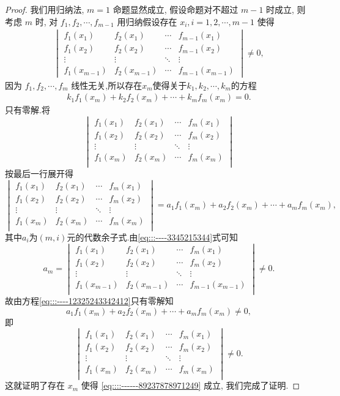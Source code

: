\documentclass[../../main.tex]{subfiles}%
\begin{document}
\begin{proof}
我们用归纳法, \( m = 1 \) 命题显然成立, 假设命题对不超过 \( m - 1 \) 时成立, 则考虑 \( m \) 时, 对 \( f_1, f_2, \cdots, f_{m - 1} \) 用归纳假设存在 \( x_i, i = 1, 2, \cdots, m - 1 \) 使得
\begin{align}\label{eq:::----3345215344}
\begin{vmatrix}
f_1(x_1) & f_2(x_1) & \cdots & f_{m - 1}(x_1) \\
f_1(x_2) & f_2(x_2) & \cdots & f_{m - 1}(x_2) \\
\vdots & \vdots & \ddots & \vdots \\
f_1(x_{m - 1}) & f_2(x_{m - 1}) & \cdots & f_{m - 1}(x_{m - 1})
\end{vmatrix} \neq 0,
\end{align}
因为 \( f_1, f_2, \cdots, f_m \) 线性无关,所以存在$x_m$使得关于$k_1,k_2,\cdots,k_m$的方程
\begin{align}\label{eq:::----12325243342412}
k_1f_1\left( x_m \right) +k_2f_2\left( x_m \right) +\cdots +k_mf_m\left( x_m \right) =0.
\end{align}
只有零解.将
\[
\begin{vmatrix}
f_1(x_1)&f_2(x_1)&\cdots&f_m(x_1)\\
f_1(x_2)&f_2(x_2)&\cdots&f_m(x_2)\\
\vdots&\vdots&\ddots&\vdots\\
f_1(x_m)&f_2(x_m)&\cdots&f_m(x_m)\\
\end{vmatrix}
\]
按最后一行展开得
\[
\begin{vmatrix}
f_1(x_1)&f_2(x_1)&\cdots&f_m(x_1)\\
f_1(x_2)&f_2(x_2)&\cdots&f_m(x_2)\\
\vdots&\vdots&\ddots&\vdots\\
f_1(x_m)&f_2(x_m)&\cdots&f_m(x_m)\\
\end{vmatrix}=a_1f_1(x_m)+a_2f_2(x_m)+\cdots+a_mf_m(x_m),
\]
其中$a_i$为$(m,i)$元的代数余子式.由\eqref{eq:::----3345215344}式可知
\[
a_m=\begin{vmatrix}
f_1(x_1)&f_2(x_1)&\cdots&f_m(x_1)\\
f_1(x_2)&f_2(x_2)&\cdots&f_m(x_2)\\
\vdots&\vdots&\ddots&\vdots\\
f_1(x_{m-1})&f_2(x_{m-1})&\cdots&f_{m-1}(x_{m-1})\\
\end{vmatrix}\ne 0.
\]
故由方程\eqref{eq:::----12325243342412}只有零解知
\[
a_1f_1(x_m)+a_2f_2(x_m)+\cdots+a_mf_m(x_m)\ne 0,
\]
即
\[
\begin{vmatrix}
f_1(x_1)&f_2(x_1)&\cdots&f_m(x_1)\\
f_1(x_2)&f_2(x_2)&\cdots&f_m(x_2)\\
\vdots&\vdots&\ddots&\vdots\\
f_1(x_m)&f_2(x_m)&\cdots&f_m(x_m)\\
\end{vmatrix}\ne 0.
\]
这就证明了存在 \( x_m \) 使得 \eqref{eq::::------89237878971249} 成立, 我们完成了证明.

\end{proof}
\end{document}
